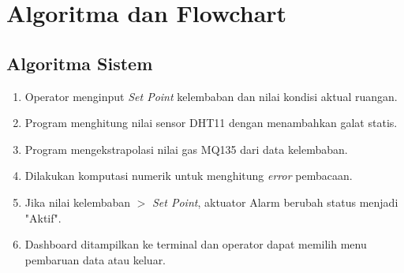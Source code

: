 \documentclass[12pt, a4paper]{article}
\begin{document}
\newpage
\section{Algoritma dan Flowchart}

\subsection{Algoritma Sistem}
\begin{enumerate}
    \item Operator menginput \textit{Set Point} kelembaban dan nilai kondisi aktual ruangan.
    \item Program menghitung nilai sensor DHT11 dengan menambahkan galat statis.
    \item Program mengekstrapolasi nilai gas MQ135 dari data kelembaban.
    \item Dilakukan komputasi numerik untuk menghitung \textit{error} pembacaan.
    \item Jika nilai kelembaban $>$ \textit{Set Point}, aktuator Alarm berubah status menjadi "Aktif".
    \item Dashboard ditampilkan ke terminal dan operator dapat memilih menu pembaruan data atau keluar.
\end{enumerate}
\end{document}
